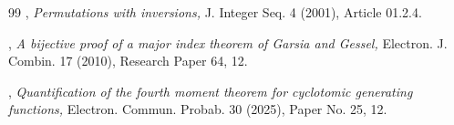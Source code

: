 \documentclass[11pt,a4paper]{scrartcl}
\numberwithin{equation}{section}
\theoremstyle{plain}
\theoremstyle{definition}
\theoremstyle{remark}
\begin{document}
\begin{thebibliography}{99}
,
{\it Permutations with inversions,}
J. Integer Seq. 4 (2001), Article 01.2.4.

,
{\it A bijective proof of a major index theorem of Garsia and Gessel,}
Electron. J. Combin. 17 (2010), Research Paper 64, 12.

,
{\it Quantification of the fourth moment theorem for cyclotomic generating functions,}
Electron. Commun. Probab. 30 (2025), Paper No. 25, 12.

\end{thebibliography}
\endgroup
\end{document}
